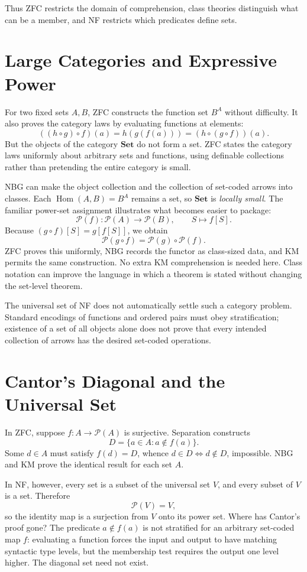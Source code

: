 Thus ZFC restricts the domain of comprehension, class theories distinguish what can be a member, and NF restricts which predicates define sets.

\section{Large Categories and Expressive Power}

For two fixed sets \(A,B\), ZFC constructs the function set \(B^A\) without difficulty. It also proves the category laws by evaluating functions at elements:
\[
 ((h\circ g)\circ f)(a)=h(g(f(a)))=(h\circ(g\circ f))(a).
\]
But the objects of the category \(\mathbf{Set}\) do not form a set. ZFC states the category laws uniformly about arbitrary sets and functions, using definable collections rather than pretending the entire category is small.

NBG can make the object collection and the collection of set-coded arrows into classes. Each \(\operatorname{Hom}(A,B)=B^A\) remains a set, so \(\mathbf{Set}\) is \emph{locally small}. The familiar power-set assignment illustrates what becomes easier to package:
\[
 \mathcal P(f):\mathcal P(A)\longrightarrow\mathcal P(B),
 \qquad S\longmapsto f[S].
\]
Because \((g\circ f)[S]=g[f[S]]\), we obtain
\[
 \mathcal P(g\circ f)=\mathcal P(g)\circ\mathcal P(f).
\]
ZFC proves this uniformly, NBG records the functor as class-sized data, and KM permits the same construction. No extra KM comprehension is needed here. Class notation can improve the language in which a theorem is stated without changing the set-level theorem.

The universal set of NF does not automatically settle such a category problem. Standard encodings of functions and ordered pairs must obey stratification; existence of a set of all objects alone does not prove that every intended collection of arrows has the desired set-coded operations.

\section{Cantor's Diagonal and the Universal Set}

In ZFC, suppose \(f:A\to\mathcal P(A)\) is surjective. Separation constructs
\[
 D=\{a\in A:a\notin f(a)\}.
\]
Some \(d\in A\) must satisfy \(f(d)=D\), whence \(d\in D\iff d\notin D\), impossible. NBG and KM prove the identical result for each set \(A\).

In NF, however, every set is a subset of the universal set \(V\), and every subset of \(V\) is a set. Therefore
\[
 \boxed{\mathcal P(V)=V},
\]
so the identity map is a surjection from \(V\) onto its power set. Where has Cantor's proof gone? The predicate \(a\notin f(a)\) is not stratified for an arbitrary set-coded map \(f\): evaluating a function forces the input and output to have matching syntactic type levels, but the membership test requires the output one level higher. The diagonal set need not exist.

